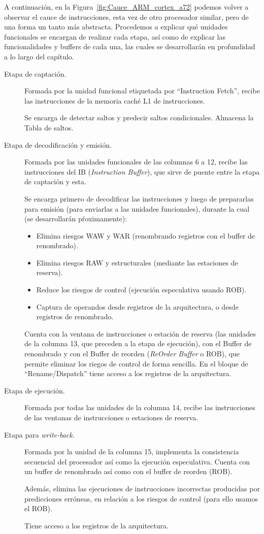 A continuación, en la Figura~\ref{fig:Cauce_ARM_cortex_a72} podemos volver a observar el cauce de instrucciones, esta vez de otro procesador similar, pero de una forma un tanto más abstracta. Procedemos a explicar qué unidades funcionales se encargan de realizar cada etapa, así como de explicar las funcionalidades y buffers de cada una, las cuales se desarrollarán en profundidad a lo largo del capítulo.

\begin{description}
    \item [Etapa de captación.] Formada por la unidad funcional etiquetada por ``Instruction Fetch'', recibe las instrucciones de la memoria caché L1 de instrucciones.

        Se encarga de detectar saltos y predecir saltos condicionales. Almacena la Tabla de saltos.
    \item [Etapa de decodificación y emisión.] Formada por las unidades funcionales de las columnas 6 a 12, recibe las instrucciones del IB (\emph{Instruction Buffer}), que sirve de puente entre la etapa de captación y esta.

        Se encarga primero de decodificar las instrucciones y luego de prepararlas para emisión (para enviarlas a las unidades funcionales), durante la cual (se desarrollarán pŕoximamente):
        \begin{itemize}
            \item Elimina riesgos WAW y WAR (renombrando registros con el buffer de renombrado).
            \item Elimina riesgos RAW y estructurales (mediante las estaciones de reserva).
            \item Reduce los riesgos de control (ejecución especulativa usando ROB).
            \item Captura de operandos desde registros de la arquitectura, o desde registros de renombrado.
        \end{itemize}
        Cuenta con la ventana de instrucciones o estación de reserva (las unidades de la columna 13, que preceden a la etapa de ejecución), con el Buffer de renombrado y con el Buffer de reorden (\emph{ReOrder Buffer} o ROB), que permite eliminar los riegos de control de forma sencilla. En el bloque de ``Rename/Dispatch'' tiene acceso a los registros de la arquitectura.
    \item [Etapa de ejecución.] Formada por todas las unidades de la columna 14, recibe las instrucciones de las ventanas de instrucciones o estaciones de reserva.
    \item [Etapa para \emph{write-back}.] Formada por la unidad de la columna 15, implementa la consistencia secuencial del procesador así como la ejecución especulativa. Cuenta con un buffer de renombrado así como con el buffer de reorden (ROB).

        Además, elimina las ejecuciones de instrucciones incorrectas producidas por predicciones erróneas, en relación a los riesgos de control (para ello usamos el ROB).

        Tiene acceso a los registros de la arquitectura.
\end{description}

